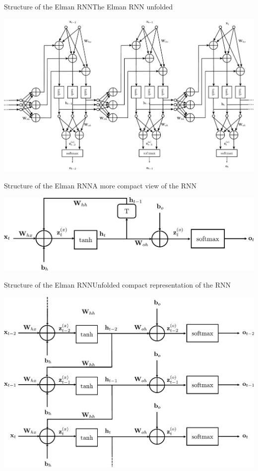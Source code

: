 \documentclass{beamer}
\begin{document}
\begin{frame}{Structure of the Elman RNN}{The Elman RNN unfolded}
\begin{center}
    \includegraphics[scale = 0.2]{Module 5 (RNN)/pics/rnn_unrolled.pdf}
    \end{center}
\end{frame}

\begin{frame}{Structure of the Elman RNN}{A more compact view of the RNN}
\begin{center}

    \includegraphics[scale = 0.4]{Module 5 (RNN)/pics/small_rnn.pdf}
    \end{center}
\end{frame}

\begin{frame}{Structure of the Elman RNN}{Unfolded compact representation of the RNN}
\begin{center}
    \includegraphics[scale = 0.35]{Module 5 (RNN)/pics/small_rnn_unrolled.pdf}
    \end{center}
\end{frame}
\end{document}
